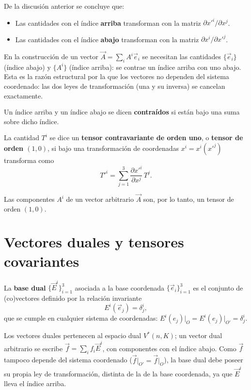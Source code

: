 \begin{observacion}
De la discusión anterior se concluye que:
\begin{itemize}
\item Las cantidades con el índice \textbf{arriba} transforman con la
matriz $\partial x'^i/\partial x^j$.
\item Las cantidades con el índice \textbf{abajo} transforman con la
matriz $\partial x^i/\partial x'^j$.
\end{itemize}
En la construcción de un vector $\vec A = \sum_i A^i \vec e_i$ se
necesitan las cantidades $\{\vec e_i\}$ (índice abajo) y $\{A^i\}$
(índice arriba): se contrae un índice arriba con uno abajo. Esta es la
razón estructural por la que los vectores no dependen del sistema
coordenado: las dos leyes de transformación (una y su inversa) se
cancelan exactamente.
\end{observacion}

\begin{definicion}
Un índice arriba y un índice abajo se dicen \textbf{contraídos} si están
bajo una suma sobre dicho índice.
\end{definicion}

\begin{definicion}
La cantidad $T^i$ se dice un \textbf{tensor contravariante de orden uno},
o \textbf{tensor de orden $(1,0)$}, si bajo una transformación de
coordenadas $x^i=x^i(x'^j)$ transforma como
\[
T'^i = \sum_{j=1}^{3} \frac{\partial x'^i}{\partial x^j}\, T^j .
\]
\end{definicion}

Las componentes $A^i$ de un vector arbitrario $\vec A$ son, por lo tanto,
un tensor de orden $(1,0)$.

\section{Vectores duales y tensores covariantes}

\begin{definicion}
La \textbf{base dual} $\{\vec E^i\}_{i=1}^3$ asociada a la base
coordenada $\{\vec e_i\}_{i=1}^3$ es el conjunto de (co)vectores definido
por la relación invariante
\[
E^i(\vec e_j) = \delta^i_j ,
\]
que se cumple en cualquier sistema de coordenadas:
$E^i(e_j)\big|_O = E^i(e_j)\big|_{O'} = \delta^i_j$.
\end{definicion}

\begin{observacion}
Los vectores duales pertenecen al espacio dual $V^*(n,K)$; un vector dual
arbitrario se escribe $\vec f = \sum_i f_i \vec E^i$, con componentes con
el índice abajo. Como $\vec f$ tampoco depende del sistema coordenado
($\vec f\big|_{O'}=\vec f\big|_O$), la base dual debe poseer su propia
ley de transformación, distinta de la de la base coordenada, ya que
$\vec E^i$ lleva el índice arriba.
\end{observacion}

